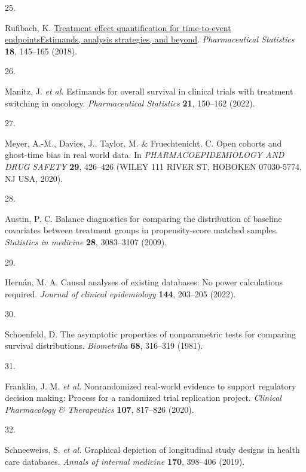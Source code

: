 \documentclass[
  letterpaper,
  DIV=11,
  numbers=noendperiod]{scrartcl}
\newlength{\cslhangindent}
\newlength{\csllabelwidth}
\newenvironment{CSLReferences}[2] %
 {\begin{list}{}{%
  \setlength{\itemindent}{0pt}
  \setlength{\leftmargin}{0pt}
  \setlength{\parsep}{0pt}
  \ifodd #1
   \setlength{\leftmargin}{\cslhangindent}
   \setlength{\itemindent}{-1\cslhangindent}
  \fi
  \setlength{\itemsep}{#2\baselineskip}}}
 {\end{list}}
\newcommand{\CSLLeftMargin}[1]{\parbox[t]{\csllabelwidth}{\strut#1\strut}}
\newcommand{\CSLRightInline}[1]{\parbox[t]{\linewidth - \csllabelwidth}{\strut#1\strut}}
\begin{document}
\begin{CSLReferences}{0}{0}
\CSLLeftMargin{25. }%
\CSLRightInline{Rufibach, K.
\href{https://doi.org/10.1002/pst.1917}{Treatment effect quantification
for time{-}to{-}event endpoints{\textendash}Estimands, analysis
strategies, and beyond}. \emph{Pharmaceutical Statistics} \textbf{18},
145--165 (2018).}

\CSLLeftMargin{26. }%
\CSLRightInline{Manitz, J. \emph{et al.} Estimands for overall survival
in clinical trials with treatment switching in oncology.
\emph{Pharmaceutical Statistics} \textbf{21}, 150--162 (2022).}

\CSLLeftMargin{27. }%
\CSLRightInline{Meyer, A.-M., Davies, J., Taylor, M. \& Fruechtenicht,
C. Open cohorts and ghost-time bias in real world data. In
\emph{PHARMACOEPIDEMIOLOGY AND DRUG SAFETY} \textbf{29}, 426--426 (WILEY
111 RIVER ST, HOBOKEN 07030-5774, NJ USA, 2020).}

\CSLLeftMargin{28. }%
\CSLRightInline{Austin, P. C. Balance diagnostics for comparing the
distribution of baseline covariates between treatment groups in
propensity-score matched samples. \emph{Statistics in medicine}
\textbf{28}, 3083--3107 (2009).}

\CSLLeftMargin{29. }%
\CSLRightInline{Hernán, M. A. Causal analyses of existing databases: No
power calculations required. \emph{Journal of clinical epidemiology}
\textbf{144}, 203--205 (2022).}

\CSLLeftMargin{30. }%
\CSLRightInline{Schoenfeld, D. The asymptotic properties of
nonparametric tests for comparing survival distributions.
\emph{Biometrika} \textbf{68}, 316--319 (1981).}

\CSLLeftMargin{31. }%
\CSLRightInline{Franklin, J. M. \emph{et al.} Nonrandomized real-world
evidence to support regulatory decision making: Process for a randomized
trial replication project. \emph{Clinical Pharmacology \& Therapeutics}
\textbf{107}, 817--826 (2020).}

\CSLLeftMargin{32. }%
\CSLRightInline{Schneeweiss, S. \emph{et al.} Graphical depiction of
longitudinal study designs in health care databases. \emph{Annals of
internal medicine} \textbf{170}, 398--406 (2019).}


\end{CSLReferences}
\end{document}
